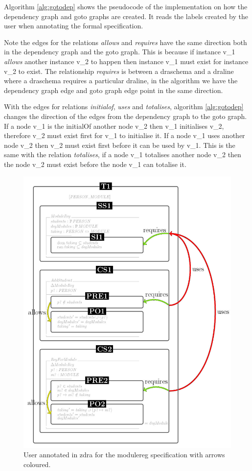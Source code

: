 Algorithm \ref{alg:gotodep} shows the pseudocode of the implementation on how
the dependency graph and goto graphs are created. It reads the labels created by
the user when annotating the formal specification. 

Note the edges for the relations \emph{allows} and \emph{requires} have the same
direction both in the dependency graph and the goto graph. This is because if
instance v\_1 \emph{allows} another instance v\_2 to happen then instance v\_1
must exist for instance v\_2 to exist. The relationship \emph{requires} is
between a draschema and a draline where a draschema requires a particular
draline, in the algorithm we have the dependency graph edge and goto graph edge
point in the same direction.

With the edges for relations \emph{initialof}, \emph{uses} and \emph{totalises},
algorithm \ref{alg:gotodep} changes the direction of the edges from the
dependency graph to the goto graph. If a node v\_1 is the initialOf another node
v\_2 then v\_1 initialises v\_2, therefore v\_2 must exist first for v\_1 to
initialise it. If a node v\_1 uses another node v\_2 then v\_2 must exist first
before it can be used by v\_1. This is the same with the relation
\emph{totalises}, if a node v\_1 totalises another node v\_2 then the node v\_2
must exist before the node v\_1 can totalise it.

\begin{figure}[H]
\centering
\includegraphics[scale=0.7]{Figures/Formalising/dramodule.png}
\caption{User annotated in \gls{zdra} for the modulereg specification with arrows coloured. \label{fig:zdramodule}}
\end{figure}

